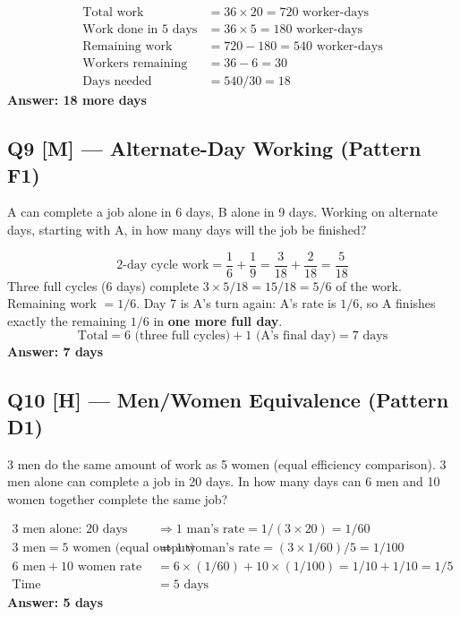 \documentclass[11pt]{article}
\begin{document}
\begin{tipbox}[Solution]
\begin{align*}
\text{Total work} &= 36 \times 20 = 720 \text{ worker-days} \\
\text{Work done in 5 days} &= 36 \times 5 = 180 \text{ worker-days} \\
\text{Remaining work} &= 720 - 180 = 540 \text{ worker-days} \\
\text{Workers remaining} &= 36 - 6 = 30 \\
\text{Days needed} &= 540/30 = 18
\end{align*}
\textbf{Answer: 18 more days}
\end{tipbox}

\subsection*{Q9 [M] --- Alternate-Day Working (Pattern F1)}
A can complete a job alone in 6 days, B alone in 9 days. Working on alternate days, starting with A,
in how many days will the job be finished?

\begin{tipbox}[Solution]
\[
\text{2-day cycle work} = \frac{1}{6} + \frac{1}{9} = \frac{3}{18} + \frac{2}{18} = \frac{5}{18}
\]
Three full cycles (6 days) complete $3 \times 5/18 = 15/18 = 5/6$ of the work. Remaining work $=1/6$.
Day 7 is A's turn again: A's rate is $1/6$, so A finishes exactly the remaining $1/6$ in \textbf{one
more full day}.
\[
\text{Total} = 6 \text{ (three full cycles)} + 1 \text{ (A's final day)} = 7 \text{ days}
\]
\textbf{Answer: 7 days}
\end{tipbox}

\subsection*{Q10 [H] --- Men/Women Equivalence (Pattern D1)}
3 men do the same amount of work as 5 women (equal efficiency comparison). 3 men alone can complete a
job in 20 days. In how many days can 6 men and 10 women together complete the same job?

\begin{tipbox}[Solution]
\begin{align*}
\text{3 men alone: 20 days} &\Rightarrow 1 \text{ man's rate} = 1/(3\times20) = 1/60 \\
3 \text{ men} = 5 \text{ women (equal output)} &\Rightarrow 1 \text{ woman's rate} =
(3\times1/60)/5 = 1/100 \\
6 \text{ men} + 10 \text{ women rate} &= 6\times(1/60) + 10\times(1/100) = 1/10 + 1/10 = 1/5 \\
\text{Time} &= 5 \text{ days}
\end{align*}
\textbf{Answer: 5 days}
\end{tipbox}
\end{document}
